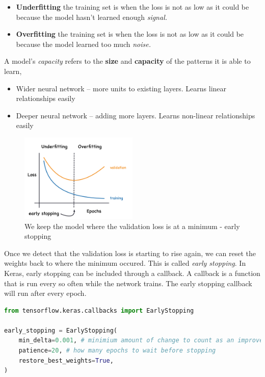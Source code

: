 \begin{itemize}
	\item \textbf{Underfitting} the training set is when the loss is not as
		low as it could be because the model hasn't learned enough \emph{signal.}
	\item \textbf{Overfitting} the training set is when the loss is not as low
		as it could be because the model learned too much \emph{noise.}
\end{itemize}

\noindent A model's \emph{capacity} refers to the \textbf{size} and \textbf{capacity} of the
patterns it is able to learn,
\begin{itemize}
	\item Wider neural network -- more units to existing layers. Learns linear
		relationships easily
	\item Deeper neural network -- adding more layers. Learns non-linear
		relationships easily
\end{itemize}

\begin{figure}[htp]
	\centering
	\includegraphics[width=0.5\textwidth]{../assets/machine_learning_random/early_stopping.png}
	\caption{We keep the model where the validation loss is at a minimum - early stopping}
\end{figure}

\noindent Once we detect that the validation loss is starting to rise again, we can reset
the weights back to where the minimum occured. This is called \emph{early stopping}. In
Keras, early stopping can be included through a callback. A callback is a function that is
run every so often while the network trains. The early stopping callback will run after
every epoch.

\begin{lstlisting}[language=Python]
from tensorflow.keras.callbacks import EarlyStopping

early_stopping = EarlyStopping(
    min_delta=0.001, # minimium amount of change to count as an improvement
    patience=20, # how many epochs to wait before stopping
    restore_best_weights=True,
)
\end{lstlisting}

